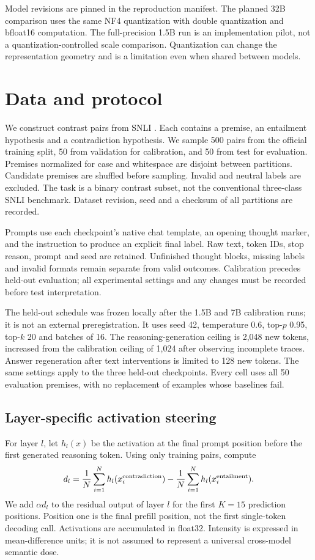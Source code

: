\documentclass[11pt]{article}
\begin{document}
Model revisions are pinned in the reproduction manifest. The planned 32B comparison
uses the same NF4 quantization with double quantization and bfloat16 computation.
The full-precision 1.5B run is an implementation pilot, not a quantization-controlled
scale comparison. Quantization can change the representation geometry and is a
limitation even when shared between models.

\section{Data and protocol}
We construct contrast pairs from SNLI \cite{bowman2015}. Each contains a premise,
an entailment hypothesis and a contradiction hypothesis. We sample 500 pairs from
the official training split, 50 from validation for calibration, and 50 from test
for evaluation. Premises normalized for case and whitespace are disjoint between
partitions. Candidate premises are shuffled before sampling. Invalid and neutral
labels are excluded. The task is a binary contrast subset, not the conventional
three-class SNLI benchmark. Dataset revision, seed and a checksum of all partitions
are recorded.

Prompts use each checkpoint's native chat template, an opening thought marker, and
the instruction to produce an explicit final label. Raw text, token IDs, stop reason,
prompt and seed are retained. Unfinished thought blocks, missing labels and invalid
formats remain separate from valid outcomes. Calibration precedes held-out evaluation;
all experimental settings and any changes must be recorded before test interpretation.

The held-out schedule was frozen locally after the 1.5B and 7B calibration runs;
it is not an external preregistration. It uses seed 42, temperature 0.6, top-$p$ 0.95,
top-$k$ 20 and batches of 16. The reasoning-generation ceiling is 2,048 new tokens,
increased from the calibration ceiling of 1,024 after observing incomplete traces.
Answer regeneration after text interventions is limited to 128 new tokens.
The same settings apply to the three held-out checkpoints. Every cell uses all 50
evaluation premises, with no replacement of examples whose baselines fail.

\subsection{Layer-specific activation steering}
For layer $l$, let $h_l(x)$ be the activation at the final prompt position before the
first generated reasoning token. Using only training pairs, compute
\begin{equation}
 d_l = \frac{1}{N}\sum_{i=1}^N h_l(x_i^{\rm contradiction})
       -\frac{1}{N}\sum_{i=1}^N h_l(x_i^{\rm entailment}).
\end{equation}
We add $\alpha d_l$ to the residual output of layer $l$ for the first $K=15$
prediction positions. Position one is the final prefill position, not the first
single-token decoding call. Activations are accumulated in float32. Intensity
is expressed in mean-difference units; it is not assumed to represent a universal
cross-model semantic dose.
\end{document}
